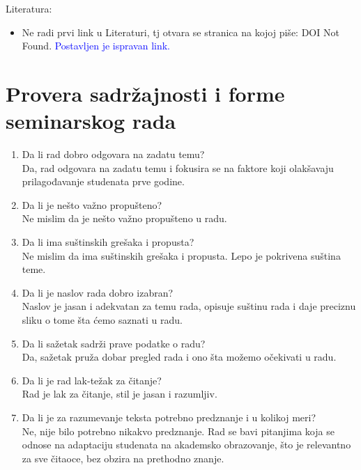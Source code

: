 \documentclass[a4paper]{report}
\newcommand{\odgovor}[1]{\textcolor{blue}{#1}}
\begin{document}
Literatura:
\begin{itemize}
    \item Ne radi prvi link u Literaturi, tj otvara se stranica na kojoj piše: DOI Not Found. \odgovor{Postavljen je ispravan link.}
\end{itemize}




\section{Provera sadržajnosti i forme seminarskog rada}

\begin{enumerate}
\item Da li rad dobro odgovara na zadatu temu?\\
Da, rad odgovara na zadatu temu i fokusira se na faktore koji olakšavaju prilagođavanje studenata prve godine.

\item Da li je nešto važno propušteno?\\
Ne mislim da je nešto važno propušteno u radu.

\item Da li ima suštinskih grešaka i propusta?\\
Ne mislim da ima suštinskih grešaka i propusta. Lepo je pokrivena suština teme.

\item Da li je naslov rada dobro izabran?\\
Naslov je jasan i adekvatan za temu rada, opisuje suštinu rada i daje preciznu sliku o tome šta ćemo saznati u radu.


\item Da li sažetak sadrži prave podatke o radu?\\
Da, sažetak pruža dobar pregled rada i ono šta možemo očekivati u radu.

\item Da li je rad lak-težak za čitanje?\\
Rad je lak za čitanje, stil je jasan i razumljiv.

\item Da li je za razumevanje teksta potrebno predznanje i u kolikoj meri?\\
Ne, nije bilo potrebno nikakvo predznanje. Rad se bavi pitanjima koja se odnose na adaptaciju studenata na akademsko obrazovanje, što je relevantno za sve čitaoce, bez obzira na prethodno znanje.


\end{enumerate}
\end{document}
